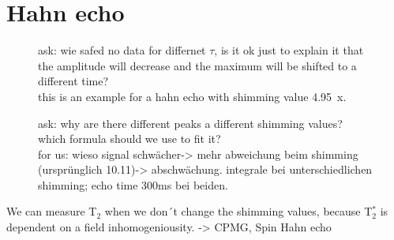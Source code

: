 \section{Hahn echo}
\label{sec:Hahnecho}



\begin{figure}[H]
    \centering
    
    \caption[]{ask: wie safed no data for differnet $\tau$, is it ok just to explain it that the amplitude will decrease and the maximum will be shifted to a different time?\\
    
    this is an example for a hahn echo with shimming value \SI{4.95}{x}.}
    \label{fig:Echobeispeilsignal}
\end{figure}
\begin{figure}[H]
    \centering
    
    \caption[]{ask: why are there different peaks a different shimming values?\newline
    which formula should we use to fit it?\\
    
    for us: wieso signal schwächer-> mehr abweichung beim shimming (ursprünglich 10.11)-> abschwächung. integrale bei unterschiedlichen shimming; echo time 300ms bei beiden. }
    \label{fig:SpinEcho}
\end{figure}
We can measure T$_2$ when we don´t change the shimming values, because T$_2^*$ is dependent on a field inhomogeniousity. -> CPMG, Spin Hahn echo
